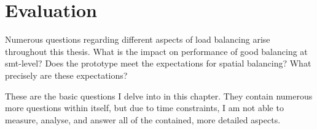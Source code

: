 \chapter{Evaluation}
\label{sec:evaluation}


Numerous questions regarding different aspects of load balancing arise
throughout this thesis.
What is the impact on performance of good balancing at \gls{smt}-level?
Does the prototype meet the expectations for spatial balancing?
What precisely are these expectations?

These are the basic questions I delve into in this chapter.
They contain numerous more questions within itself, but due to time
constraints, I am not able to measure, analyse, and answer all of the
contained, more detailed aspects.





\begin{comment}

Is behaviour aware load balancing on L4Re better than behaviour unaware
balancing?
What differences are observable between different SMT assignment schemes?

When compared with Linux \gls{cfs} scheduler, how different is the
performance?

Of interest are performance degradation compared to solo execution, when
executed in parallel with other applications.
Also, the related work suggests that the execution time is much more
deterministic, hence the maximum and minimum execution times are close
together.


\end{comment}


\cleardoublepage

